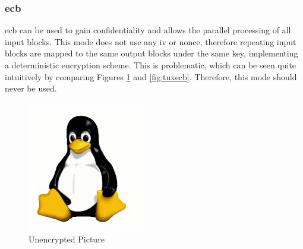 \subsubsection{\gls{ecb}}\label{deterministicEnc}

\gls{ecb} can be used to gain confidentiality and allows the parallel processing of all input blocks. This mode does not use any \gls{iv} or nonce, therefore
repeating input blocks are mapped to the same output blocks under the same key, implementing a deterministic encryption scheme.
This is problematic, which can be seen quite intuitively by comparing 
Figures \ref{fig:tuxclr} and \ref{fig:tuxecb}. Therefore, this mode should never be used.
\\
 \begin{minipage}{\linewidth}
      \centering
      \begin{minipage}{0.4\linewidth}
          \begin{figure}[H]
              \includegraphics[width=\linewidth]{figures/TuxCleartext.png}
              \caption{Unencrypted Picture}
              \label{fig:tuxclr}
          \end{figure}
      \end{minipage}
      \hspace{0.05\linewidth}

\end{minipage}
